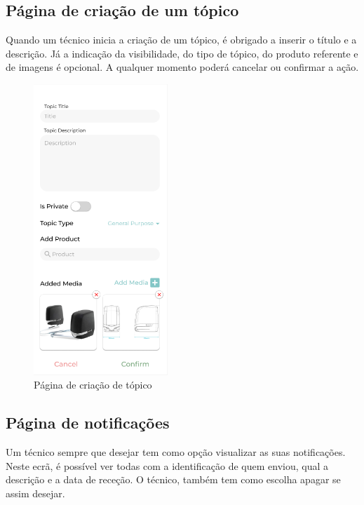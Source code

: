 \newpage

\subsection{Página de criação de um tópico}

Quando um técnico inicia a criação de um tópico, é obrigado a inserir o título e a descrição. Já a indicação da visibilidade, do tipo de tópico, do produto referente e de imagens é opcional. A qualquer momento poderá cancelar ou confirmar a ação.

\begin{figure}[htb]
  \centering
  \includegraphics[width=0.45\textwidth]{images/mockups/forum_create_topic.png}
  \caption{Página de criação de tópico}
  \label{fig:28}
\end{figure}

\newpage

\subsection{Página de notificações}

Um técnico sempre que desejar tem como opção visualizar as suas notificações. Neste ecrã, é possível ver todas com a identificação de quem enviou, qual a descrição e a data de receção. O técnico, também tem como escolha apagar se assim desejar.

